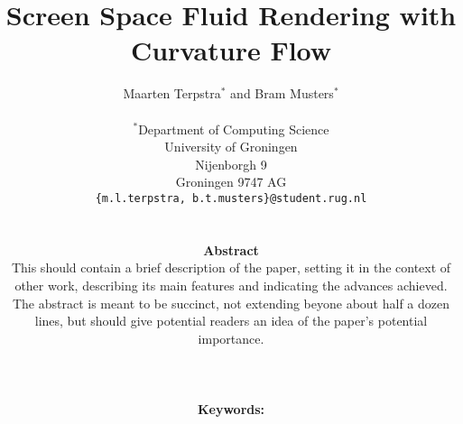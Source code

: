 \documentclass[a4paper, 10pt, twocolumn]{eguk2000}
\begin{document}

\title{Screen Space Fluid Rendering with Curvature Flow}
\author{{\sffamily Maarten Terpstra${}^\ast$ and Bram Musters${}^\ast$}\\
\\
${}^\ast$Department of Computing Science\\
University of Groningen\\
Nijenborgh 9\\
Groningen 9747 AG\\
{\tt \{m.l.terpstra, b.t.musters\}@student.rug.nl}\\
\\
\parbox{140truemm}{\normalsize
{\bfseries Abstract}\\
This should contain a brief description
of the paper, setting it in the context of other work, describing its
main features and indicating the advances achieved. The abstract is
meant to be succinct, not extending beyone about half a dozen lines,
but should give potential readers an idea of the paper's potential
importance.}
\\
\\
\parbox{140truemm}{\normalsize
{\bfseries Keywords:}
}
} %

\date{}


\maketitle 










\end{document}
